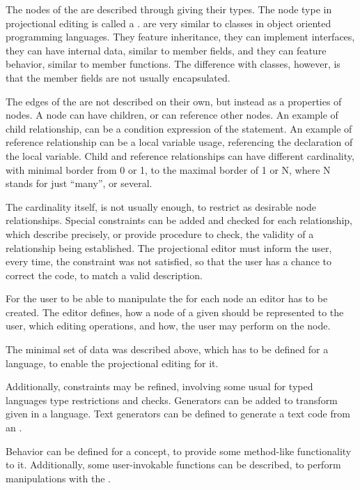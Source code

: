 The nodes of the  are described through giving their types. The node type in projectional editing is called a .  are very
similar to classes in object oriented programming languages. They feature inheritance, they can implement interfaces, they can have internal data, similar
to member fields, and they can feature behavior, similar to member functions. The difference with classes, however, is that the member fields are not 
usually encapsulated.

The edges of the  are not described on their own, but instead as a properties of nodes. A node can have children, or can reference other nodes.
An example of child relationship, can be a condition expression of the  statement. An example of reference relationship can be a local variable usage,
referencing the declaration of the local variable. Child and reference relationships can have different cardinality, with minimal border from 0 or 1, to the 
maximal border of 1 or N, where N stands for just ``many'', or several.

The cardinality itself, is not usually enough, to restrict as desirable node relationships. Special constraints can be added and checked for 
each relationship, which describe precisely, or provide procedure to check, the validity of a relationship being established. The projectional editor
must inform the user, every time, the constraint was not satisfied, so that the user has a chance to correct the code, to match a valid  description.

For the user to be able to manipulate the  for each node  an editor has to be created. The editor defines, how a node of a given 
should be represented to the user, which editing operations, and how, the user may perform on the node.

The minimal set of data was described above, which has to be defined for a language, to enable the projectional editing for it.

Additionally, constraints may be refined, involving some usual for typed languages type restrictions and checks. Generators can be added to 
transform  given in a language. Text generators can be defined to generate a text code from an .

Behavior can be defined for a concept, to provide some method-like functionality to it. Additionally, some user-invokable functions can be described, to
perform manipulations with the .

